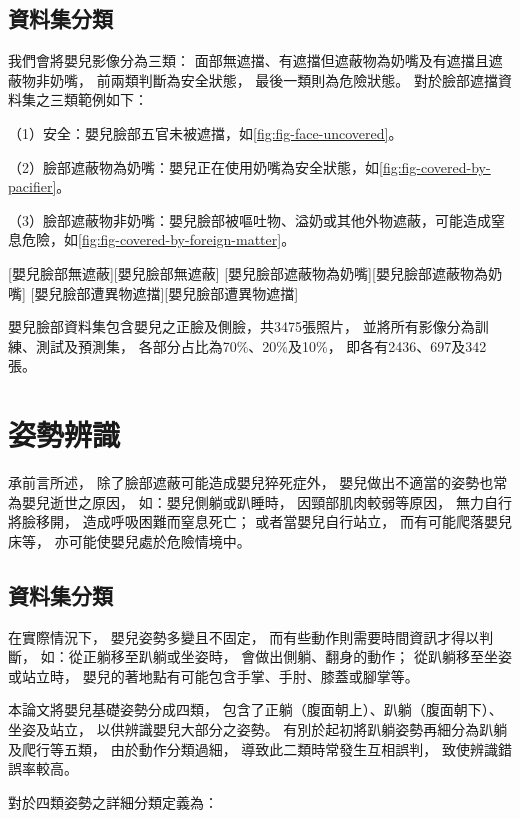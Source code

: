 \documentclass[class=NCU_thesis, crop=false]{standalone}
\begin{document}
\subsection{資料集分類}
我們會將嬰兒影像分為三類：
面部無遮擋、有遮擋但遮蔽物為奶嘴及有遮擋且遮蔽物非奶嘴，
前兩類判斷為安全狀態，
最後一類則為危險狀態。
對於臉部遮擋資料集之三類範例如下：

（1）安全：嬰兒臉部五官未被遮擋，如\cref{fig:fig-face-uncovered}。

（2）臉部遮蔽物為奶嘴：嬰兒正在使用奶嘴為安全狀態，如\cref{fig:fig-covered-by-pacifier}。

（3）臉部遮蔽物非奶嘴：嬰兒臉部被嘔吐物、溢奶或其他外物遮蔽，可能造成窒息危險，如\cref{fig:fig-covered-by-foreign-matter}。

[嬰兒臉部無遮蔽][嬰兒臉部無遮蔽]
[嬰兒臉部遮蔽物為奶嘴][嬰兒臉部遮蔽物為奶嘴]
[嬰兒臉部遭異物遮擋][嬰兒臉部遭異物遮擋]

嬰兒臉部資料集包含嬰兒之正臉及側臉，共3475張照片，
並將所有影像分為訓練、測試及預測集，
各部分占比為70\%、20\%及10\%，
即各有2436、697及342張。

\section{姿勢辨識}
承前言所述，
除了臉部遮蔽可能造成嬰兒猝死症外，
嬰兒做出不適當的姿勢也常為嬰兒逝世之原因，
如：嬰兒側躺或趴睡時，
因頸部肌肉較弱等原因，
無力自行將臉移開，
造成呼吸困難而窒息死亡；
或者當嬰兒自行站立，
而有可能爬落嬰兒床等，
亦可能使嬰兒處於危險情境中。

\subsection{資料集分類}
在實際情況下，
嬰兒姿勢多變且不固定，
而有些動作則需要時間資訊才得以判斷，
如：從正躺移至趴躺或坐姿時，
會做出側躺、翻身的動作；
從趴躺移至坐姿或站立時，
嬰兒的著地點有可能包含手掌、手肘、膝蓋或腳掌等。

本論文將嬰兒基礎姿勢分成四類，
包含了正躺（腹面朝上）、趴躺（腹面朝下）、坐姿及站立，
以供辨識嬰兒大部分之姿勢。
有別於起初將趴躺姿勢再細分為趴躺及爬行等五類，
由於動作分類過細，
導致此二類時常發生互相誤判，
致使辨識錯誤率較高。

對於四類姿勢之詳細分類定義為：
\end{document}
